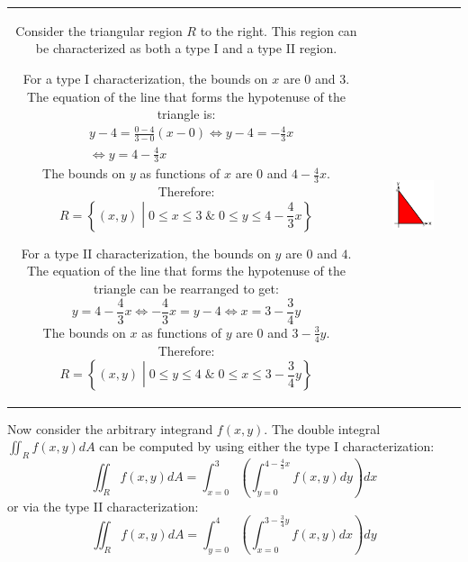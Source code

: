 \documentclass{article}
\begin{document}
\begin{tabular}{cc}
\parbox{0.5\textwidth}{
Consider the triangular region \(R\) to the right. This region can be characterized as both a type I and a type II region.    

For a type I characterization, the bounds on \(x\) are \(0\) and \(3\). The equation of the line that forms the hypotenuse of the triangle is: 
\begin{align*}
& y - 4 = \frac{0 - 4}{3 - 0}(x - 0) 
\iff y - 4 = -\frac{4}{3}x \\
& \iff y = 4 - \frac{4}{3}x
\end{align*}
The bounds on \(y\) as functions of \(x\) are \(0\) and \(4 - \frac{4}{3}x\). Therefore:
\[R = \left\{(x,y) \middle| 0 \leq x \leq 3 \;\&\; 0 \leq y \leq 4 - \frac{4}{3}x\right\}\]

For a type II characterization, the bounds on \(y\) are \(0\) and \(4\). The equation of the line that forms the hypotenuse of the triangle can be rearranged to get:
\[y = 4 - \frac{4}{3}x \iff -\frac{4}{3}x = y - 4 \iff x = 3 - \frac{3}{4}y\]
The bounds on \(x\) as functions of \(y\) are \(0\) and \(3 - \frac{3}{4}y\). Therefore:
\[R = \left\{(x,y) \middle| 0 \leq y \leq 4 \;\&\; 0 \leq x \leq 3 - \frac{3}{4}y\right\}\]

} & \parbox{0.5\textwidth}{
\includegraphics[width = 0.5\textwidth]{Example_1}
}
\end{tabular}
Now consider the arbitrary integrand \(f(x,y)\). The double integral \(\iint_R f(x,y)dA\) can be computed by using either the type I characterization: 
\[\iint_R f(x,y)dA = \int_{x = 0}^3 \left(\int_{y = 0}^{4 - \frac{4}{3}x} f(x,y)dy\right)dx\] 
or via the type II characterization: 
\[\iint_R f(x,y)dA = \int_{y = 0}^4 \left(\int_{x = 0}^{3 - \frac{3}{4}y} f(x,y)dx\right)dy\]
\end{document}
